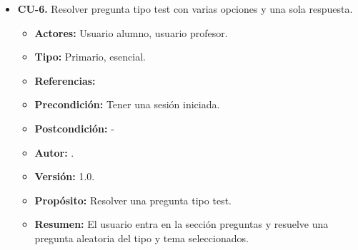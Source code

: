 \begin{itemize}
  \item \textbf{CU-6.} Resolver pregunta tipo test con varias opciones y una sola respuesta.
  \begin{itemize}
    \item \textbf{Actores:} Usuario alumno, usuario profesor.
    \item \textbf{Tipo:} Primario, esencial.
    \item \textbf{Referencias:}
    \item \textbf{Precondición:} Tener una sesión iniciada.
    \item \textbf{Postcondición:} -
    \item \textbf{Autor:} \autor.
    \item \textbf{Versión:} 1.0.
    \item \textbf{Propósito:} Resolver una pregunta tipo test.
    \item \textbf{Resumen:} El usuario entra en la sección preguntas y resuelve una pregunta aleatoria del tipo y tema seleccionados.


\end{itemize}
\end{itemize}

